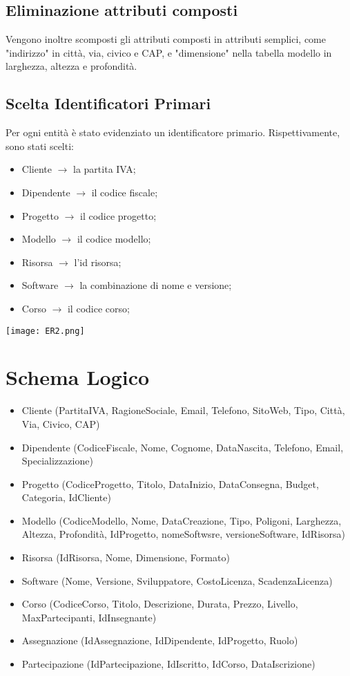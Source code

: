 \documentclass[a4paper,11pt]{article}
\begin{document}
{\subsection{Eliminazione attributi composti}
Vengono inoltre scomposti gli attributi composti in attributi semplici, come "indirizzo" in città, via, civico e CAP, e "dimensione" nella tabella modello in larghezza, altezza e profondità.
\newpage


\subsection{Scelta Identificatori Primari}
Per ogni entità è stato evidenziato un identificatore primario. Rispettivamente, sono stati scelti:

\begin{itemize}
  \item Cliente $\longrightarrow$ la partita IVA;
  \item Dipendente $\longrightarrow$ il codice fiscale;
  \item Progetto $\longrightarrow$ il codice progetto;
  \item Modello $\longrightarrow$ il codice modello;
  \item Risorsa $\longrightarrow$ l'id risorsa;
  \item Software $\longrightarrow$ la combinazione di nome e versione;
  \item Corso $\longrightarrow$ il codice corso;
\end{itemize}


\texttt{[image: ER2.png]}
\newpage


\section{Schema Logico}

\begin{itemize}
  \item Cliente (PartitaIVA, RagioneSociale, Email, Telefono, SitoWeb, Tipo, Città, Via, Civico, CAP)
  \item Dipendente (CodiceFiscale, Nome, Cognome, DataNascita, Telefono, Email, Specializzazione)
  \item Progetto (CodiceProgetto, Titolo, DataInizio, DataConsegna, Budget, Categoria, IdCliente)
  \item Modello (CodiceModello, Nome, DataCreazione, Tipo, Poligoni, Larghezza, Altezza, Profondità, IdProgetto, nomeSoftwsre, versioneSoftware, IdRisorsa)
  \item Risorsa (IdRisorsa, Nome, Dimensione, Formato)
  \item Software (Nome, Versione, Sviluppatore, CostoLicenza, ScadenzaLicenza)
  \item Corso (CodiceCorso, Titolo, Descrizione, Durata, Prezzo, Livello, MaxPartecipanti, IdInsegnante)
  \item Assegnazione (IdAssegnazione, IdDipendente, IdProgetto, Ruolo)
   \item Partecipazione (IdPartecipazione, IdIscritto, IdCorso, DataIscrizione)


\end{itemize}}
\end{document}
